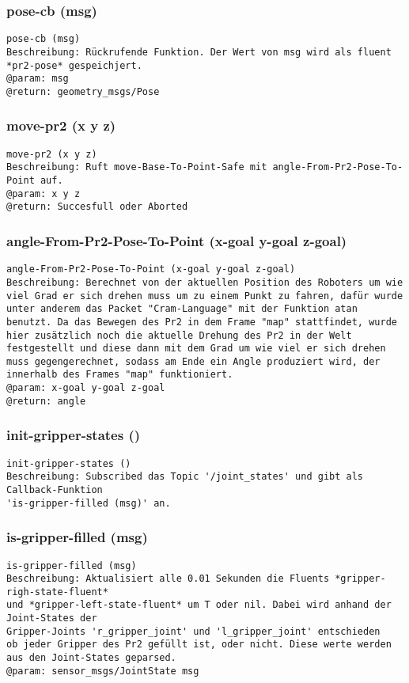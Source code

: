 \documentclass{suturo}
\begin{document}
\subsubsection{pose-cb (msg)}
\begin{verbatim}
pose-cb (msg)
Beschreibung: Rückrufende Funktion. Der Wert von msg wird als fluent *pr2-pose* gespeichjert.
@param: msg
@return: geometry_msgs/Pose
\end{verbatim}

\subsubsection{move-pr2 (x y z)}
\begin{verbatim}
move-pr2 (x y z)
Beschreibung: Ruft move-Base-To-Point-Safe mit angle-From-Pr2-Pose-To-Point auf.
@param: x y z 
@return: Succesfull oder Aborted
\end{verbatim}

\subsubsection{angle-From-Pr2-Pose-To-Point (x-goal y-goal z-goal)}
\begin{verbatim}
angle-From-Pr2-Pose-To-Point (x-goal y-goal z-goal)
Beschreibung: Berechnet von der aktuellen Position des Roboters um wie viel Grad er sich drehen muss um zu einem Punkt zu fahren, dafür wurde unter anderem das Packet "Cram-Language" mit der Funktion atan benutzt. Da das Bewegen des Pr2 in dem Frame "map" stattfindet, wurde hier zusätzlich noch die aktuelle Drehung des Pr2 in der Welt festgestellt und diese dann mit dem Grad um wie viel er sich drehen muss gegengerechnet, sodass am Ende ein Angle produziert wird, der innerhalb des Frames "map" funktioniert. 
@param: x-goal y-goal z-goal 
@return: angle 
\end{verbatim}

\subsubsection{init-gripper-states ()}
\begin{verbatim}
init-gripper-states ()
Beschreibung: Subscribed das Topic '/joint_states' und gibt als Callback-Funktion
'is-gripper-filled (msg)' an.
\end{verbatim}

\subsubsection{is-gripper-filled (msg)}
\begin{verbatim}
is-gripper-filled (msg)
Beschreibung: Aktualisiert alle 0.01 Sekunden die Fluents *gripper-righ-state-fluent* 
und *gripper-left-state-fluent* um T oder nil. Dabei wird anhand der Joint-States der
Gripper-Joints 'r_gripper_joint' und 'l_gripper_joint' entschieden
ob jeder Gripper des Pr2 gefüllt ist, oder nicht. Diese werte werden
aus den Joint-States geparsed.
@param: sensor_msgs/JointState msg 
\end{verbatim}
\end{document}
